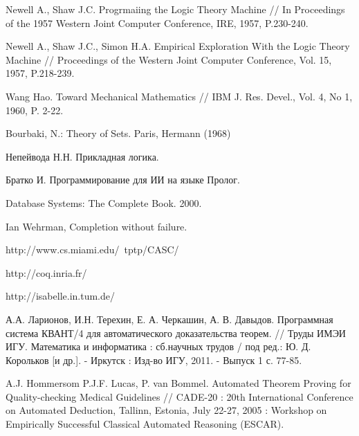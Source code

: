 \begin{thebibliography}{99}
 Newell A., Shaw J.C. Progrmaiing the Logic Theory Machine // In Proceedings of the 1957 Western Joint Computer Conference, IRE, 1957, P.230-240.

 Newell A., Shaw J.C., Simon H.A. Empirical Exploration With the Logic Theory Machine // Proceedings of the Western Joint Computer Conference, Vol. 15, 1957, P.218-239.

 Wang Hao. Toward Mechanical Mathematics // IBM J. Res. Devel., Vol. 4, No 1, 1960, P. 2-22. 

 Bourbaki, N.: Theory of Sets. Paris, Hermann (1968)

 Непейвода Н.Н. Прикладная логика.

 Братко И. Программирование для ИИ на языке Пролог.

 Database Systems: The Complete Book. 2000.

 Ian Wehrman, Completion without failure.

 http://www.cs.miami.edu/~tptp/CASC/

 http://coq.inria.fr/

 http://isabelle.in.tum.de/

 А.А. Ларионов, И.Н. Терехин, Е. А. Черкашин, А. В. Давыдов.
Программная система КВАНТ/4 для автоматического доказательства теорем.
// Труды ИМЭИ ИГУ. Математика и информатика : сб.научных трудов / под
ред.: Ю. Д. Корольков [и др.]. - Иркутск : Изд-во ИГУ, 2011. - Выпуск
1 с. 77-85.

 A.J. Hommersom P.J.F. Lucas, P. van Bommel. Automated Theorem Proving for Quality-checking Medical Guidelines // CADE-20 : 20th International Conference on Automated Deduction, Tallinn, Estonia, July 22-27, 2005 : Workshop on Empirically Successful Classical Automated Reasoning (ESCAR).


\end{thebibliography}



